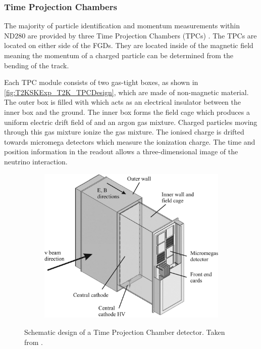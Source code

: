\subsubsection{Time Projection Chambers}
\label{subsubsec:T2KSKExp_T2K_TPCs}

The majority of particle identification and momentum measurements within ND280 are provided by three Time Projection Chambers (TPCs) \cite{Abgrall2011}. The TPCs are located on either side of the FGDs. They are located inside of the magnetic field meaning the momentum of a charged particle can be determined from the bending of the track.

Each TPC module consists of two gas-tight boxes, as shown in \autoref{fig:T2KSKExp_T2K_TPCDesign}, which are made of non-magnetic material. The outer box is filled with  which acts as an electrical insulator between the inner box and the ground. The inner box forms the field cage which produces a uniform electric drift field of  and an argon gas mixture. Charged particles moving through this gas mixture ionize the gas mixture. The ionised charge is drifted towards micromega detectors which measure the ionization charge. The time and position information in the readout allows a three-dimensional image of the neutrino interaction.

\begin{figure}[h]
  \begin{subfigure}[t]{0.55\textwidth}
    \includegraphics[width=\textwidth, trim={0mm 0mm 0mm 0mm}, clip,page=1]{Figures/Detectors/T2KTPCDesign.pdf}
  \end{subfigure}
  \caption{Schematic design of a Time Projection Chamber detector. Taken from \cite{Abgrall2011}.}
  \label{fig:T2KSKExp_T2K_TPCDesign}
\end{figure}


